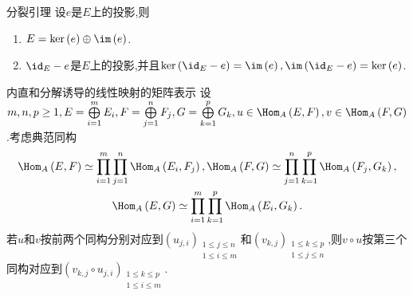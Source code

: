 \begin{corollary}{分裂引理}{}
	设$e$是$E$上的投影,则
	\begin{enumerate}
		\item $E=\ker\left(e\right)\oplus\im\left(e\right)$.
		\item $\id_{E}-e$是$E$上的投影,并且$\ker\left(\id_{E}-e\right)=\im\left(e\right),\im\left(\id_{E}-e\right)=\ker\left(e\right)$.
	\end{enumerate}
\end{corollary}

\begin{remark}{内直和分解诱导的线性映射的矩阵表示}{}
	设$m,n,p\geq 1,E=\bigoplus\limits_{i=1}^{m}E_{i},F=\bigoplus\limits_{j=1}^{n}F_{j},G=\bigoplus\limits_{k=1}^{p}G_{k},u\in\Hom_{A}\left(E,F\right),v\in\Hom_{A}\left(F,G\right)$.考虑典范同构
	\begin{gather*}
		\Hom_{A}\left(E,F\right)\simeq\prod\limits_{i=1}^{m}\prod\limits_{j=1}^{n}\Hom_{A}\left(E_{i},F_{j}\right),\Hom_{A}\left(F,G\right)\simeq\prod\limits_{j=1}^{n}\prod\limits_{k=1}^{p}\Hom_{A}\left(F_{j},G_{k}\right),\\
		\Hom_{A}\left(E,G\right)\simeq\prod\limits_{i=1}^{m}\prod\limits_{k=1}^{p}\Hom_{A}\left(E_{i},G_{k}\right).
	\end{gather*}
	若$u$和$v$按前两个同构分别对应到$\left(u_{j,i}\right)_{\substack{1\leq j\leq n\\1\leq i\leq m}}$和$\left(v_{k,j}\right)_{\substack{1\leq k\leq p\\1\leq j\leq n}}$,则$v\circ u$按第三个同构对应到$\left(v_{k,j}\circ u_{j,i}\right)_{\substack{1\leq k\leq p\\1\leq i\leq m}}$.
\end{remark}
